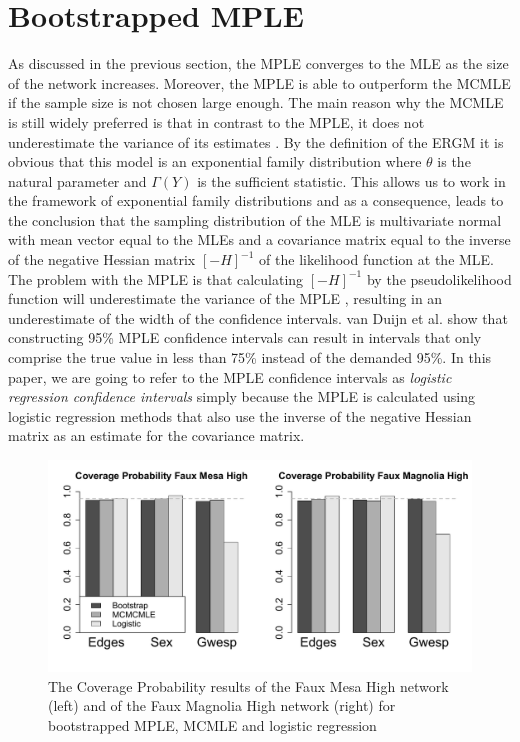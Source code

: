 \documentclass[headsepline=true, abstracton]{scrartcl}
\begin{document}
\section*{Bootstrapped MPLE}
As discussed in the previous section, the MPLE converges to the MLE as the size of the network increases. Moreover, the MPLE is able to outperform the MCMLE if the sample size is not chosen large enough. The main reason why the MCMLE is still widely preferred is that in contrast to the MPLE, it does not underestimate the variance of its estimates \cite{vanDuijnetal2009}. By the definition of the ERGM it is obvious that this model is an exponential family distribution where $\theta$ is the natural parameter and $\Gamma (Y)$ is the sufficient statistic. This allows us to work in the framework of exponential family distributions and as a consequence, leads to the conclusion that the sampling distribution of the MLE is multivariate normal with mean vector equal to the MLEs and a covariance matrix equal to the inverse of the negative Hessian matrix $[-H]^{-1}$ of the likelihood function at the MLE. The problem with the MPLE is that calculating $[-H]^{-1}$ by the pseudolikelihood function will underestimate the variance of the MPLE \cite{vanDuijnetal2009}, resulting in an underestimate of the width of the confidence intervals. van Duijn et al. show that constructing 95\% MPLE confidence intervals can result in intervals that only comprise the true value in less than 75\% instead of the demanded 95\%. In this paper, we are going to refer to the MPLE confidence intervals as \textit{logistic regression confidence intervals} simply because the MPLE is calculated using logistic regression methods that also use the inverse of the negative Hessian matrix as an estimate for the covariance matrix. \\[0.3cm]
\begin{figure}[h]
\begin{center}
\includegraphics[scale=.5]{Coverage_Mesa_Magnolia_height05}
\caption{The Coverage Probability results of the Faux Mesa High network (left) and of the Faux Magnolia High network (right) for bootstrapped MPLE, MCMLE and logistic regression }
\label{coverage}
\end{center}
\end{figure}
\end{document}
